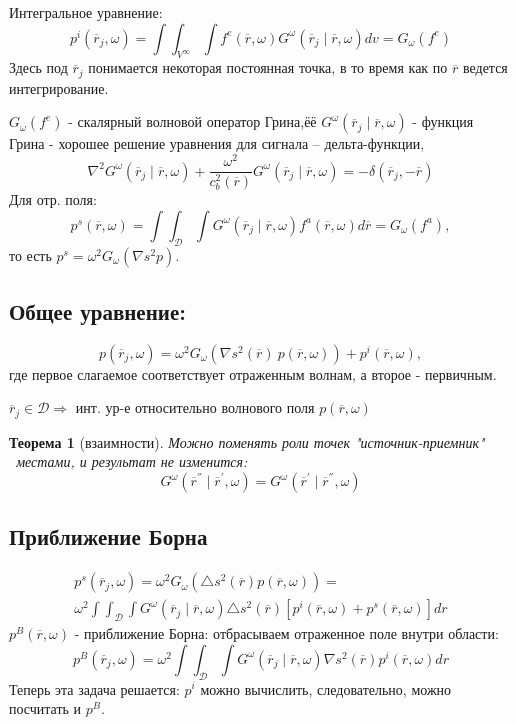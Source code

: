 \documentclass[a4paper,14pt]{article}
\theoremstyle{plain} %
\newtheorem{theorem}{Теорема}[section]
\theoremstyle{definition} %
\theoremstyle{remark} %
\renewcommand{\r}{\ensuremath{\overline{r}}}
\begin{document}
	Интегральное уравнение:
	$$p^i(\r_j, \omega) = \int\int_{V^\infty}\int f^e(\r, \omega)G^\omega(\r_j \mid \r, \omega)dv = G_\omega(f^e)$$
	Здесь под $\r_j$ понимается некоторая постоянная точка, в то время как по $\r$ ведется интегрирование.
	
	$G_\omega(f^e)$ - скалярный волновой оператор Грина,ёё
	$G^\omega(\r_j \mid \r,\omega)$ - функция Грина - хорошее решение уравнения для сигнала -- дельта-функции, \\
	$$\nabla^2 G^\omega(\r_j \mid \r, \omega) + \dfrac{\omega^2}{c^2_b(\r)}G^\omega(\r_j \mid \r, \omega) = - \delta(\r_j, -\r)$$
	Для отр. поля:
	$$p^s(\r, \omega) = \int\int_\mathcal{D}\int G^\omega(\r_j \mid \r, \omega) f^a(\r, \omega)d\r = G_\omega(f^a),$$
	то есть $p^s = \omega^2 G_\omega(\nabla s^2p)$.
	
	\subsection{Общее уравнение:}
	 $$p(\r_j, \omega) = \omega^2 G_\omega\left(\nabla s^2(\r)\ p(\r, \omega)\right) + p^i(\r, \omega),$$
	 где первое слагаемое соответствует отраженным волнам, а второе - первичным.
	 
	 $\r_j \in \mathcal{D} \Rightarrow$  инт. ур-е относительно волнового поля $p(\r,\omega)$
	 
	 \begin{theorem}[взаимности]
	 	Можно поменять роли точек "источник-приемник"
	 	\ местами, и результат не изменится:
	 	$$G^\omega(\r^{''} \mid \r^{'}, \omega) = G^\omega(\r^{'} \mid \r^{''}, \omega)$$
	 \end{theorem}
 
 	\subsection{Приближение Борна}
 	\begin{multline*}p^s(\r_j, \omega) = \omega^2G_\omega\left(\triangle s^2(\r)p(\r, \omega)\right) = \\ \omega^2 \int\int_\mathcal{D}\int G^\omega(\r_j \mid \r, \omega)\triangle s^2(\r)\left[p^i(\r,\omega) + p^s(\r,\omega)\right]dr
 	\end{multline*}
 	$p^B(\r,\omega)$ - приближение Борна: отбрасываем отраженное поле внутри области:
 	$$p^B(\r_j, \omega) = \omega^2 \int\int_\mathcal{D}\int G^\omega\left(\r_j \mid \r, \omega\right)\nabla s^2(\r)p^i(\r, \omega)dr$$
 	Теперь эта задача решается: $p^i$ можно вычислить, следовательно, можно посчитать и $p^B$.
 	
\end{document}
